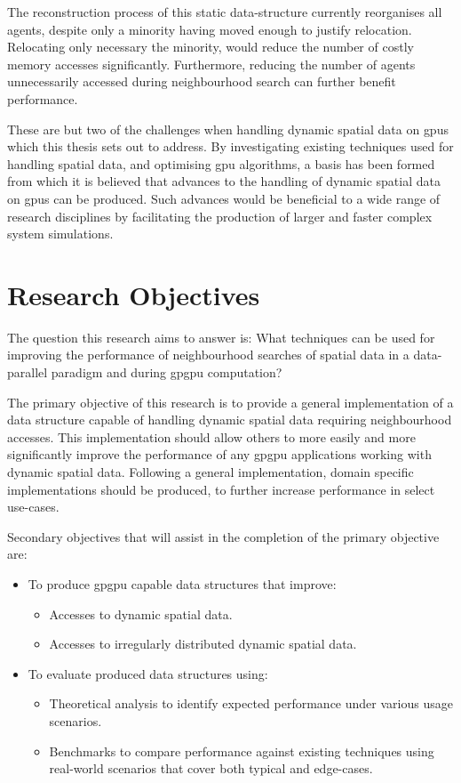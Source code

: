   The reconstruction process of this static data-structure currently reorganises all agents, despite only a minority having moved enough to justify relocation. Relocating only necessary the minority, would reduce the number of costly memory accesses significantly. Furthermore, reducing the number of agents unnecessarily accessed during neighbourhood search can further benefit performance.
  
  These are but two of the challenges when handling dynamic spatial data on \glspl{gpu} which this thesis sets out to address. By investigating existing techniques used for handling spatial data, and optimising \gls{gpu} algorithms, a basis has been formed from which it is believed that advances to the handling of dynamic spatial data on \glspl{gpu} can be produced. Such advances would be beneficial to a wide range of research disciplines by facilitating the production of larger and faster complex system simulations.
 
  \section{Research Objectives}
    The question this research aims to answer is: What techniques can be used for improving the performance of neighbourhood searches of spatial data in a data-parallel paradigm and during \gls{gpgpu} computation? 

    The primary objective of this research is to provide a general implementation of a data structure capable of handling dynamic spatial data requiring neighbourhood accesses. This implementation should allow others to more easily and more significantly improve the performance of any \gls{gpgpu} applications working with dynamic spatial data. Following a general implementation, domain specific implementations should be produced, to further increase performance in select use-cases.

    Secondary objectives that will assist in the completion of the primary objective are:
    \begin{itemize}
      \item To produce \gls{gpgpu} capable data structures that improve:
      \begin{itemize}
        \item Accesses to dynamic spatial data.
        \item Accesses to irregularly distributed dynamic spatial data. 
      \end{itemize}
      \item To evaluate produced data structures using:
      \begin{itemize}
        \item Theoretical analysis to identify expected performance under various usage scenarios.
        \item Benchmarks to compare performance against existing techniques using real-world scenarios that cover both typical and edge-cases.
      \end{itemize}
    \end{itemize}

